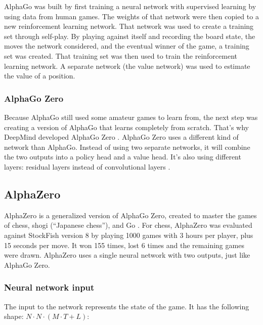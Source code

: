 \documentclass{article}
\begin{document}
AlphaGo was built \cite{AlphaGo, MasteringGameGo}  by first training a neural network with supervised learning by using data from human games.
The weights of that network were then copied to a new reinforcement learning network. That network was used to 
create a training set through self-play. By playing against itself and recording the board state, the 
moves the network considered, and the eventual winner of the game, a training set was created.
That training set was then used to train the reinforcement learning network. A separate network (the value network) 
was used to estimate the value of a position. 

\subsubsection{AlphaGo Zero}

Because AlphaGo still used some amateur games to learn from, the next step was creating a version of AlphaGo
that learns completely from scratch. That's why DeepMind developed AlphaGo Zero \cite{AlphaGoZero2022}.
AlphaGo Zero uses a different kind of network than AlphaGo. Instead of using two separate networks, 
it will combine the two outputs into a policy head and a value head. It's also using different layers:
residual layers instead of convolutional layers \cite{MasteringGameZero}. 

\subsection{AlphaZero}

AlphaZero is a generalized version of AlphaGo Zero, created to master the games of chess, shogi (``Japanese chess''), and Go \cite{AlphaZero2022, silverMasteringChessShogi2017a}. 
For chess, AlphaZero was evaluated against StockFish version 8 by playing 1000 games with 3 hours per player, plus 
15 seconds per move. It won 155 times, lost 6 times and the remaining games were drawn. 
AlphaZero uses a single neural network with two outputs, just like AlphaGo Zero. 


\subsubsection{Neural network input}

The input to the network represents the state of the game. 
It has the following shape: $N \cdot N \cdot (M \cdot T + L)$:
\end{document}
